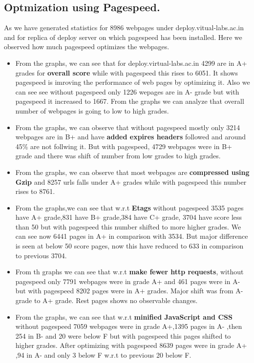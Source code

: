 \documentclass[a4paper,10pt]{IEEEtran}
\begin{document}
\subsection{Optmization using Pagespeed.}\label{sec-6.2}

As we have generated statistics for 8986 webpages under
deploy.vitual-labs.ac.in and for replica of deploy server on which pagespeed has
been installed. Here we observed how much pagespeed optimizes the webpages.
\begin{itemize}
\item From the graphs, we can see that for deploy.virtual-labs.ac.in 4299 are in
A+ grades for \textbf{overall score} while with pagespeed this rises to 6051. It
shows pagespeed is imroving the performance of web pages by optimizing it. Also
we can see see without pagespeed only 1226 wepages are in A- grade but with
pagespeed it increased to 1667. From the graphs we can analyze that overall
number of webpages is going to low to high grades.
\item From the graphs, we can observe that without pagespeed  mostly only 3214
webpages are in B+  and have \textbf{added expires headers} followed  and around
45\% are not follwing it. But with pagespeed, 4729 webpages were in B+ grade and
there was shift of number from low grades to high grades.
\item From the graphs, we can observe that most webpages are \textbf{compressed
using Gzip} and 8257 urls falls under A+ grades while with pagespeed this number
rises to 8761.
\item From the graphs,we can see that w.r.t \textbf{Etags} without pagespeed
3535 pages have A+ grade,831 have B+ grade,384 have C+ grade, 3704 have score
less than 50 but with pagespeed this number shifted to more higher grades. We can
see now 6441 pages in A+  in comparison with 3534. But major difference is seen
at below 50 score pages, now this have reduced to 633 in comparison to previous
3704.
\item From th graphs we can see that w.r.t \textbf{make fewer http
requests}, without pagespeed only 7791 webpages were in grade A+ and 461 pages
were in A- but with pagespeed 8202 pages were in A+ grades. Major shift was from 
A- grade to A+ grade. Rest pages shows no observable changes.
\item From the graphs, we can see that w.r.t \textbf{minified JavaScript and CSS}
without pagespeed 7059 webpages were in grade A+,1395 pages in A- ,then 254 in
B- and 20 were below F but with pagespeed this pages shifted to higher
grades. After optimizing with pagespeed 8639 pages were in grade A+ ,94 in A- and only 3 below F w.r.t to
previous 20 below F.
\end{itemize}
\end{document}

